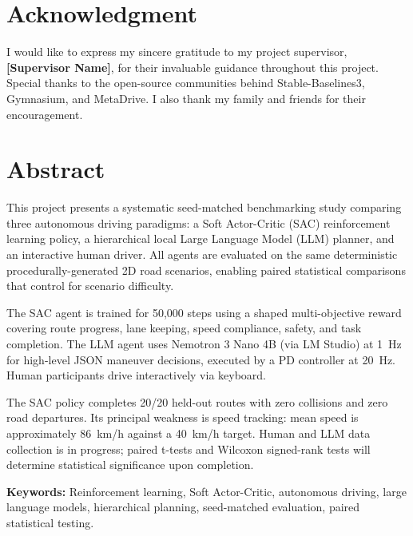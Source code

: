 \documentclass[12pt,a4paper]{report}
\begin{document}
\chapter*{Acknowledgment}

I would like to express my sincere gratitude to my project supervisor, \textbf{[Supervisor Name]}, for their invaluable guidance throughout this project. Special thanks to the open-source communities behind Stable-Baselines3, Gymnasium, and MetaDrive. I also thank my family and friends for their encouragement.
\clearpage

\chapter*{Abstract}

This project presents a systematic seed-matched benchmarking study comparing three autonomous driving paradigms: a Soft Actor-Critic (SAC) reinforcement learning policy, a hierarchical local Large Language Model (LLM) planner, and an interactive human driver. All agents are evaluated on the same deterministic procedurally-generated 2D road scenarios, enabling paired statistical comparisons that control for scenario difficulty.

The SAC agent is trained for 50,000 steps using a shaped multi-objective reward covering route progress, lane keeping, speed compliance, safety, and task completion. The LLM agent uses Nemotron 3 Nano 4B (via LM Studio) at 1~Hz for high-level JSON maneuver decisions, executed by a PD controller at 20~Hz. Human participants drive interactively via keyboard.

The SAC policy completes 20/20 held-out routes with zero collisions and zero road departures. Its principal weakness is speed tracking: mean speed is approximately 86~km/h against a 40~km/h target. Human and LLM data collection is in progress; paired t-tests and Wilcoxon signed-rank tests will determine statistical significance upon completion.

\vspace{1em}
\noindent\textbf{Keywords:} Reinforcement learning, Soft Actor-Critic, autonomous driving, large language models, hierarchical planning, seed-matched evaluation, paired statistical testing.
\clearpage

\tableofcontents\clearpage
\listoffigures
{}\clearpage
\listoftables
{}\clearpage
\end{document}
